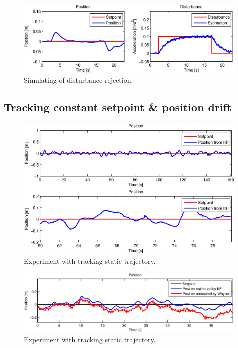 \begin{figure}[H]
\centering
\includegraphics[width=0.99\textwidth]{fig/simulation4_disturbance_rejection.eps}
\caption{Simulating of disturbance rejection.}
\label{fig:simulation_step_governor}
\end{figure}

\subsection{Tracking constant setpoint \& position drift}

\begin{figure}[H]
\centering
\includegraphics[width=0.99\textwidth]{fig/experiment6_constant_reference.eps}
\caption{Experiment with tracking static trajectory.}
\label{fig:experiment_sine_1}
\end{figure}

\begin{figure}[H]
\centering
\includegraphics[width=0.99\textwidth]{fig/experiment5_drift_constant.eps}
\caption{Experiment with tracking static trajectory.}
\label{fig:experiment_sine_1}
\end{figure}

